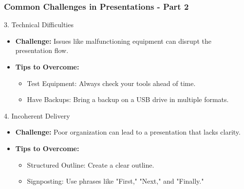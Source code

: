 \documentclass[aspectratio=169]{beamer}
\begin{document}
\begin{frame}[fragile]
    \frametitle{Common Challenges in Presentations - Part 2}
    \begin{block}{3. Technical Difficulties}
        \begin{itemize}
            \item \textbf{Challenge:} Issues like malfunctioning equipment can disrupt the presentation flow.
            \item \textbf{Tips to Overcome:}
                \begin{itemize}
                    \item Test Equipment: Always check your tools ahead of time.
                    \item Have Backups: Bring a backup on a USB drive in multiple formats.
                \end{itemize}
        \end{itemize}
    \end{block}

    \begin{block}{4. Incoherent Delivery}
        \begin{itemize}
            \item \textbf{Challenge:} Poor organization can lead to a presentation that lacks clarity.
            \item \textbf{Tips to Overcome:}
                \begin{itemize}
                    \item Structured Outline: Create a clear outline.
                    \item Signposting: Use phrases like "First," "Next," and "Finally."
                \end{itemize}
        \end{itemize}
    \end{block}
\end{frame}
\end{document}
